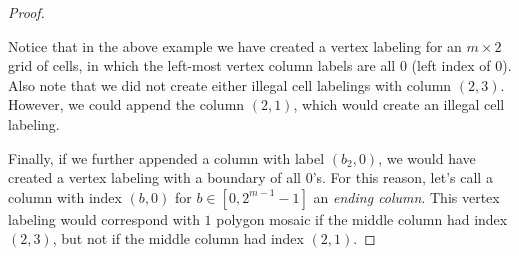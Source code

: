 \documentclass[12pt]{article}
\theoremstyle{plain}
\theoremstyle{definition}
\theoremstyle{remark}
\theoremstyle{definition}
\newcommand{\cell}[4]{ \draw[thick] ( #1 , #2 ) rectangle ( #3 , #4 );}
\newcommand{\lablnode}[3]{\node[shape=circle,draw=none,fill=none, inner sep=0pt,minimum size=5pt] (A) at ( #1 , #2 ) {#3};}
\newcommand{\lablvertex}[3]{\node[shape=circle,draw=none,fill=white, inner sep=2pt,minimum size=5pt] (A) at ( #1 , #2 ) {#3};}
\begin{document}
\begin{proof}
\begin{center}
\end{center}

Notice that in the above example we have created a vertex labeling for an $m \times 2$ grid of cells, in which the left-most vertex column labels are all $0$ (left index of $0$). Also note that we did not create either illegal cell labelings with column $(2,3)$. However, we could append the column $(2,1)$, which would create an illegal cell labeling. 

Finally, if we further appended a column with label $(b_2,0)$, we would have created a vertex labeling with a boundary of all $0$'s. For this reason, let's call a column with index $(b,0)$ for $b \in [0,2^{m-1}-1]$ an \textit{ending column}. This vertex labeling would correspond with $1$ polygon mosaic if the middle column had index $(2,3)$, but not if the middle column had index $(2,1)$.


\end{proof}
\end{document}
